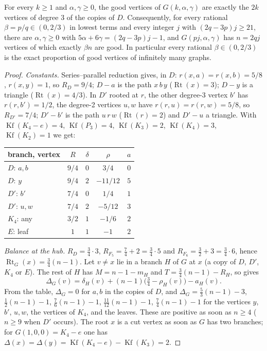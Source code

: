 \documentclass[11pt,a4paper]{report}
\newcommand*{\Kf}{\operatorname{Kf}}
\newcommand*{\Rt}{\operatorname{Rt}}
\begin{document}
\begin{theorem}\label{thm:exact}
For every \(k\ge1\) and \(\alpha,\gamma\ge0\), the good vertices of \(G(k,\alpha,\gamma)\) are exactly the \(2k\)
vertices of degree 3 of the copies of \(D\). Consequently, for every rational \(\beta=p/q\in(0,2/3)\) in lowest terms
and every integer \(j\) with \((2q-3p)j\ge21\), there are \(\alpha,\gamma\ge0\) with
\(5\alpha+6\gamma=(2q-3p)j-1\), and \(G(pj,\alpha,\gamma)\) has \(n=2qj\) vertices of which exactly \(\beta n\) are good.
In particular every rational \(\beta\in(0,2/3)\) is the exact proportion of good vertices of infinitely many graphs.
\end{theorem}
\begin{proof}
\emph{Constants.} Series--parallel reduction gives, in \(D\): \(r(x,a)=r(x,b)=5/8\), \(r(x,y)=1\), so \(R_D=9/4\);
\(D-a\) is the path \(x\,b\,y\) (\(\Rt(x)=3\)); \(D-y\) is a triangle (\(\Rt(x)=4/3\)). In \(D'\) rooted at \(r\), the
other degree-3 vertex \(b'\) has \(r(r,b')=1/2\), the degree-2 vertices \(u,w\) have \(r(r,u)=r(r,w)=5/8\), so
\(R_{D'}=7/4\); \(D'-b'\) is the path \(u\,r\,w\) (\(\Rt(r)=2\)) and \(D'-u\) a triangle. With \(\Kf(K_4-e)=4\),
\(\Kf(P_3)=4\), \(\Kf(K_3)=2\), \(\Kf(K_4)=3\), \(\Kf(K_2)=1\) we get:
\begin{center}
\begin{tabular}{lcccc}
branch, vertex & \(R\) & \(\delta\) & \(\rho\) & \(a\)\\ \hline
\(D\): \(a,b\) & \(9/4\) & \(0\) & \(3/4\) & \(0\)\\
\(D\): \(y\) & \(9/4\) & \(2\) & \(-11/12\) & \(5\)\\
\(D'\): \(b'\) & \(7/4\) & \(0\) & \(1/4\) & \(1\)\\
\(D'\): \(u,w\) & \(7/4\) & \(2\) & \(-5/12\) & \(3\)\\
\(K_4\): any & \(3/2\) & \(1\) & \(-1/6\) & \(2\)\\
\(E\): leaf & \(1\) & \(1\) & \(-1\) & \(2\)
\end{tabular}
\end{center}
\emph{Balance at the hub.} \(R_D=\tfrac34\cdot3\), \(R_{F_5}=\tfrac74+2=\tfrac34\cdot5\) and
\(R_{F_6}=\tfrac32+3=\tfrac34\cdot6\), hence \(\Rt_G(x)=\tfrac34(n-1)\). Let \(v\neq x\) lie in a branch \(H\) of \(G\)
at \(x\) (a copy of \(D\), \(D'\), \(K_4\) or \(E\)). The rest of \(H\) has \(M=n-1-m_H\) and
\(T=\tfrac34(n-1)-R_H\), so  gives
\[\Delta_G(v)=\delta_H(v)+(n-1)\bigl(\tfrac34-\rho_H(v)\bigr)-a_H(v).\]
From the table, \(\Delta_G=0\) for \(a,b\) in the copies of \(D\), and
\(\Delta_G=\tfrac53(n-1)-3\), \(\tfrac12(n-1)-1\), \(\tfrac76(n-1)-1\), \(\tfrac{11}{12}(n-1)-1\), \(\tfrac74(n-1)-1\)
for the vertices \(y\), \(b'\), \(u,w\), the vertices of \(K_4\), and the leaves. These are positive as soon as
\(n\ge4\) (\(n\ge9\) when \(D'\) occurs). The root \(x\) is a cut vertex as soon as \(G\) has two branches; for
\(G(1,0,0)=K_4-e\) one has \(\Delta(x)=\Delta(y)=\Kf(K_4-e)-\Kf(K_3)=2\).


\end{proof}
\end{document}
